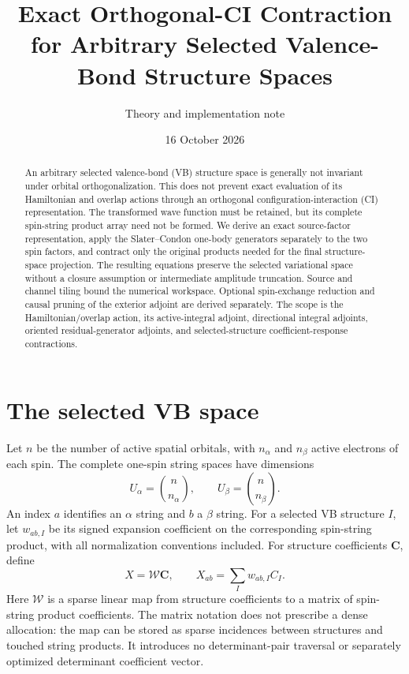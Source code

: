 \documentclass[11pt,a4paper]{article}
\title{Exact Orthogonal-CI Contraction for Arbitrary Selected\newline
Valence-Bond Structure Spaces}
\author{Theory and implementation note}
\date{16 October 2026}
\newcommand{\Wa}{\mathcal W}
\renewcommand{\vv}[1]{\mathbf{#1}}
\begin{document}
\maketitle
\begin{abstract}
An arbitrary selected valence-bond (VB) structure space is generally not
invariant under orbital orthogonalization. This does not prevent exact
evaluation of its Hamiltonian and overlap actions through an orthogonal
configuration-interaction (CI) representation. The transformed wave function
must be retained, but its complete spin-string product array need not be
formed. We derive an exact source-factor representation, apply the
Slater--Condon one-body generators separately to the two spin factors, and
contract only the original products needed for the final structure-space
projection. The resulting equations preserve the selected variational space
without a closure assumption or intermediate amplitude truncation. Source
and channel tiling bound the numerical workspace. Optional spin-exchange
reduction and causal pruning of the exterior adjoint are derived separately.
The scope is the Hamiltonian/overlap action, its active-integral adjoint,
directional integral adjoints, oriented residual-generator adjoints, and
selected-structure coefficient-response contractions.
\end{abstract}

\section{The selected VB space}

Let $n$ be the number of active spatial orbitals, with $n_\alpha$ and
$n_\beta$ active electrons of each spin. The complete one-spin string
spaces have dimensions
\begin{equation}
 U_\alpha=\binom{n}{n_\alpha},\qquad
 U_\beta=\binom{n}{n_\beta}.
\end{equation}
An index $a$ identifies an $\alpha$ string and $b$ a $\beta$ string.
For a selected VB structure $I$, let $w_{ab,I}$ be its signed expansion
coefficient on the corresponding spin-string product, with all normalization
conventions included. For structure coefficients $\vv C$, define
\begin{equation}\label{eq:W}
 X=\Wa\vv C,\qquad X_{ab}=\sum_I w_{ab,I}C_I.
\end{equation}
Here $\Wa$ is a sparse linear map from structure coefficients to a matrix
of spin-string product coefficients. The matrix notation does not prescribe
a dense allocation: the map can be stored as sparse incidences between
structures and touched string products. It introduces no determinant-pair
traversal or separately optimized determinant coefficient vector.
\end{document}
